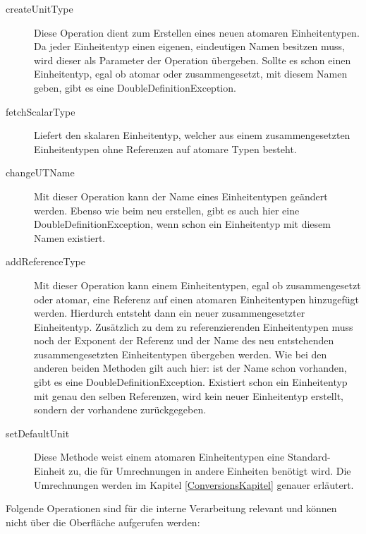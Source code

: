 \begin{description}
\item[createUnitType]
Diese Operation dient zum Erstellen eines neuen atomaren Einheitentypen. Da jeder Einheitentyp einen eigenen, eindeutigen Namen besitzen muss, wird dieser als Parameter der Operation übergeben. Sollte es schon einen Einheitentyp, egal ob atomar oder zusammengesetzt, mit diesem Namen geben, gibt es eine DoubleDefinitionException.
\item[fetchScalarType]
Liefert den skalaren Einheitentyp, welcher aus einem zusammengesetzten Einheitentypen ohne Referenzen auf atomare Typen besteht. 
\item[changeUTName]
Mit dieser Operation kann der Name eines Einheitentypen geändert werden. Ebenso wie beim neu erstellen, gibt es auch hier eine DoubleDefinitionException, wenn schon ein Einheitentyp mit diesem Namen existiert.
\item[addReferenceType]
Mit dieser Operation kann einem Einheitentypen, egal ob zusammengesetzt oder atomar, eine Referenz auf einen atomaren Einheitentypen hinzugefügt werden. Hierdurch entsteht dann ein neuer zusammengesetzter Einheitentyp. Zusätzlich zu dem zu referenzierenden Einheitentypen muss noch der Exponent der Referenz und der Name des neu entstehenden zusammengesetzten Einheitentypen übergeben werden. Wie bei den anderen beiden Methoden gilt auch hier: ist der Name schon vorhanden, gibt es eine DoubleDefinitionException. Existiert schon ein Einheitentyp mit genau den selben Referenzen, wird kein neuer Einheitentyp erstellt, sondern der vorhandene zurückgegeben.
\item[setDefaultUnit]
Diese Methode weist einem atomaren Einheitentypen eine Standard-Einheit zu, die für Umrechnungen in andere Einheiten benötigt wird. Die Umrechnungen werden im Kapitel \ref{ConversionsKapitel} genauer erläutert.
\end{description}

Folgende Operationen sind für die interne Verarbeitung relevant und können nicht über die Oberfläche aufgerufen werden:

